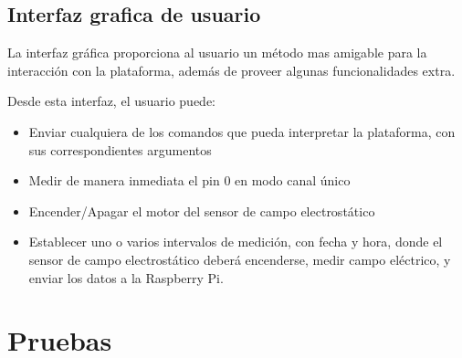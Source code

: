
\subsection{Interfaz grafica de usuario} %
\label{it7:sub:interfaz_grafica_de_usuario}

La interfaz gráfica proporciona al usuario un método mas amigable para la interacción con la plataforma, además de proveer algunas funcionalidades extra.

Desde esta interfaz, el usuario puede:

\begin{itemize}
  \item Enviar cualquiera de los comandos que pueda interpretar la plataforma, con sus correspondientes argumentos
  \item Medir de manera inmediata el pin 0 en modo canal único
  \item Encender/Apagar el motor del sensor de campo electrostático
  \item Establecer uno o varios intervalos de medición, con fecha y hora, donde el sensor de campo electrostático deberá encenderse, medir campo eléctrico, y enviar los datos a la Raspberry Pi.
\end{itemize}




\section{Pruebas} %
\label{it7:sec:pruebas}

